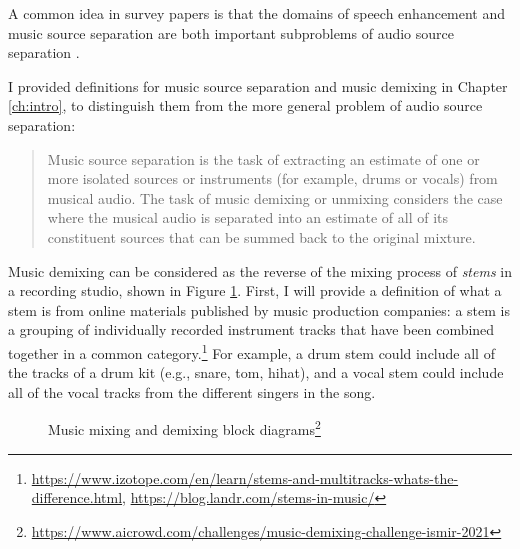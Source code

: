 \documentclass[report.tex]{subfiles}
\begin{document}
A common idea in survey papers is that the domains of speech enhancement and music source separation are both important subproblems of audio source separation \parencite{musicsepintro1, musicmask}.

I provided definitions for music source separation and music demixing in Chapter \ref{ch:intro}, to distinguish them from the more general problem of audio source separation:

\begin{quote}
Music source separation is the task of extracting an estimate of one or more isolated sources or instruments (for example, drums or vocals) from musical audio. The task of music demixing or unmixing considers the case where the musical audio is separated into an estimate of all of its constituent sources that can be summed back to the original mixture.
\end{quote}

Music demixing can be considered as the reverse of the mixing process of \textit{stems} in a recording studio, shown in Figure \ref{fig:mixingdiagrams}. First, I will provide a definition of what a stem is from online materials published by music production companies: a stem is a grouping of individually recorded instrument tracks that have been combined together in a common category.\footnote{\url{https://www.izotope.com/en/learn/stems-and-multitracks-whats-the-difference.html}, \url{https://blog.landr.com/stems-in-music/}} For example, a drum stem could include all of the tracks of a drum kit (e.g., snare, tom, hihat), and a vocal stem could include all of the vocal tracks from the different singers in the song.

\begin{figure}[ht]
	\centering
        \begin{minipage}{1.\textwidth}
		\renewcommand\footnoterule{} %
		\renewcommand{\thempfootnote}{\fnsymbol{mpfootnote}}
		\centering
		\caption[Music mixing and demixing block diagrams]{Music mixing and demixing block diagrams\footnote{\url{https://www.aicrowd.com/challenges/music-demixing-challenge-ismir-2021}}}
		\label{fig:mixingdiagrams}
	\end{minipage}
\end{figure}
\end{document}
